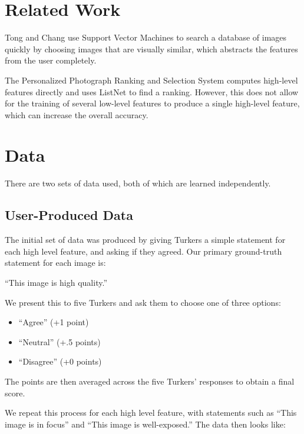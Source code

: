 \documentclass[11pt,letter]{article}
\begin{document}
\section{Related Work}
Tong and Chang\cite{Tong:2001:SVM:500141.500159} use Support Vector Machines to search a database of images quickly by choosing images that are visually similar, which abstracts the features from the user completely.

The Personalized Photograph Ranking and Selection System\cite{Yeh:2010:PPR:1873951.1873963} computes high-level features directly and uses ListNet\cite{Cao:2007:LRP:1273496.1273513} to find a ranking. However, this does not allow for the training of several low-level features to produce a single high-level feature, which can increase the overall accuracy.

\section{Data}

There are two sets of data used, both of which are learned independently.

\subsection{User-Produced Data}
\label{turkdata}
The initial set of data was produced by giving Turkers a simple statement for each high level feature, and asking if they agreed. Our primary ground-truth statement for each image is:

``This image is high quality.''

We present this to five Turkers and ask them to choose one of three options:

\begin{itemize}
\item ``Agree'' (+1 point)
\item ``Neutral'' (+.5 points)
\item ``Disagree'' (+0 points)
\end{itemize}
The points are then averaged across the five Turkers' responses to obtain a final score.

We repeat this process for each high level feature, with statements such as ``This image is in focus'' and ``This image is well-exposed.'' The data then looks like:

\end{document}
